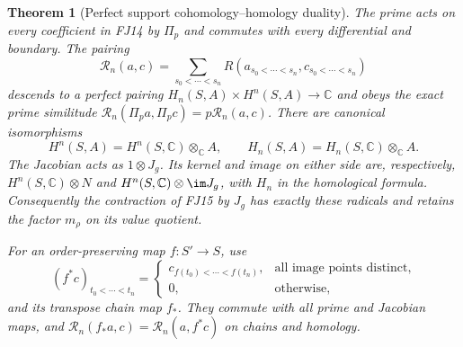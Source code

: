 \documentclass[11pt,a4paper]{article}
\newtheorem{theorem}{Theorem}[section]
\theoremstyle{definition}\newtheorem{definition}[theorem]{Definition}
\newcommand{\C}{\mathbb C}\newcommand{\R}{\mathbb R}
\begin{document}
\begin{theorem}[Perfect support cohomology--homology duality]
\label{fj:thm:support}
The prime acts on every coefficient in FJ14 by $\Pi_p$ and commutes
with every differential and boundary. The pairing
\[
 \mathcal R_n(a,c)=\sum_{s_0<\cdots<s_n}R(a_{s_0<\cdots<s_n},
                                           c_{s_0<\cdots<s_n})
 \tag{FJ15}\label{fj:fj:chain-pair}
\]
descends to a perfect pairing
$H_n(S,A)\times H^n(S,A)\to\C$ and obeys the exact prime
similitude $\mathcal R_n(\Pi_pa,\Pi_pc)=p\mathcal R_n(a,c)$.
There are canonical isomorphisms
\[
 H^n(S,A)=H^n(S,\C)\otimes_\C A,\qquad
 H_n(S,A)=H_n(S,\C)\otimes_\C A.
 \tag{FJ16}\label{fj:fj:kunneth}
\]
The Jacobian acts as $1\otimes J_g$. Its kernel and image on either
side are, respectively, $H^{n}(S,\C)\otimes N$ and
$H^{n}(S,\C)\otimes\im J_g$, with $H_n$ in the homological formula.
Consequently the contraction of FJ15 by $J_g$ has exactly these
radicals and retains the factor $m_\rho$ on its value quotient.

For an order-preserving map $f:S'\to S$, use
\[
 (f^*c)_{t_0<\cdots<t_n}=
 \begin{cases}
 c_{f(t_0)<\cdots<f(t_n)},&\text{all image points distinct},\\
 0,&\text{otherwise},
 \end{cases}
 \tag{FJ17}
\]
and its transpose chain map $f_*$. They commute with all prime and
Jacobian maps, and
$\mathcal R_n(f_*a,c)=\mathcal R_n(a,f^*c)$ on chains and homology.
\end{theorem}
\end{document}
